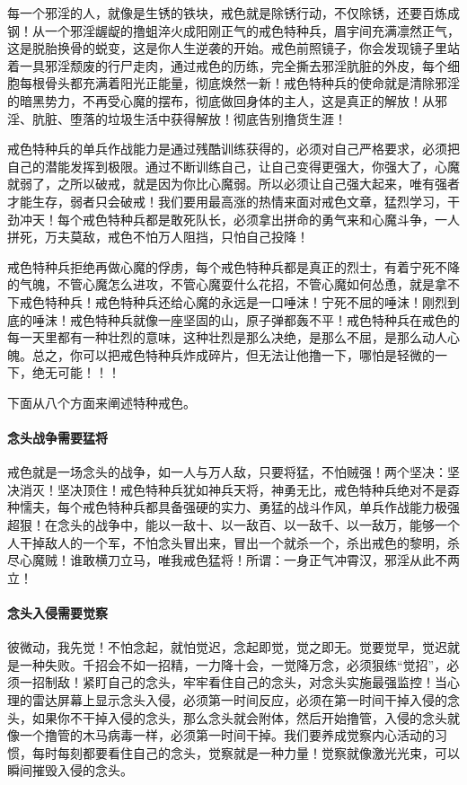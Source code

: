 每一个邪淫的人，就像是生锈的铁块，戒色就是除锈行动，不仅除锈，还要百炼成钢！从一个邪淫龌龊的撸蛆淬火成阳刚正气的戒色特种兵，眉宇间充满凛然正气，这是脱胎换骨的蜕变，这是你人生逆袭的开始。戒色前照镜子，你会发现镜子里站着一具邪淫颓废的行尸走肉，通过戒色的历练，完全撕去邪淫肮脏的外皮，每个细胞每根骨头都充满着阳光正能量，彻底焕然一新！戒色特种兵的使命就是清除邪淫的暗黑势力，不再受心魔的摆布，彻底做回身体的主人，这是真正的解放！从邪淫、肮脏、堕落的垃圾生活中获得解放！彻底告别撸货生涯！

戒色特种兵的单兵作战能力是通过残酷训练获得的，必须对自己严格要求，必须把自己的潜能发挥到极限。通过不断训练自己，让自己变得更强大，你强大了，心魔就弱了，之所以破戒，就是因为你比心魔弱。所以必须让自己强大起来，唯有强者才能生存，弱者只会破戒！我们要用最高涨的热情来面对戒色文章，猛烈学习，干劲冲天！每个戒色特种兵都是敢死队长，必须拿出拼命的勇气来和心魔斗争，一人拼死，万夫莫敌，戒色不怕万人阻挡，只怕自己投降！

戒色特种兵拒绝再做心魔的俘虏，每个戒色特种兵都是真正的烈士，有着宁死不降的气魄，不管心魔怎么进攻，不管心魔耍什么花招，不管心魔如何怂恿，就是拿不下戒色特种兵！戒色特种兵还给心魔的永远是一口唾沫！宁死不屈的唾沫！刚烈到底的唾沫！戒色特种兵就像一座坚固的山，原子弹都轰不平！戒色特种兵在戒色的每一天里都有一种壮烈的意味，这种壮烈是那么决绝，是那么不屈，是那么动人心魄。总之，你可以把戒色特种兵炸成碎片，但无法让他撸一下，哪怕是轻微的一下，绝无可能！！！

下面从八个方面来阐述特种戒色。

\paragraph{念头战争需要猛将}

戒色就是一场念头的战争，如一人与万人敌，只要将猛，不怕贼强！两个坚决：坚决消灭！坚决顶住！戒色特种兵犹如神兵天将，神勇无比，戒色特种兵绝对不是孬种懦夫，每个戒色特种兵都具备强硬的实力、勇猛的战斗作风，单兵作战能力极强超狠！在念头的战争中，能以一敌十、以一敌百、以一敌千、以一敌万，能够一个人干掉敌人的一个军，不怕念头冒出来，冒出一个就杀一个，杀出戒色的黎明，杀尽心魔贼！谁敢横刀立马，唯我戒色猛将！所谓：一身正气冲霄汉，邪淫从此不两立！

\paragraph{念头入侵需要觉察}

彼微动，我先觉！不怕念起，就怕觉迟，念起即觉，觉之即无。觉要觉早，觉迟就是一种失败。千招会不如一招精，一力降十会，一觉降万念，必须狠练“觉招”，必须一招制敌！紧盯自己的念头，牢牢看住自己的念头，对念头实施最强监控！当心理的雷达屏幕上显示念头入侵，必须第一时间反应，必须在第一时间干掉入侵的念头，如果你不干掉入侵的念头，那么念头就会附体，然后开始撸管，入侵的念头就像一个撸管的木马病毒一样，必须第一时间干掉。我们要养成觉察内心活动的习惯，每时每刻都要看住自己的念头，觉察就是一种力量！觉察就像激光光束，可以瞬间摧毁入侵的念头。

